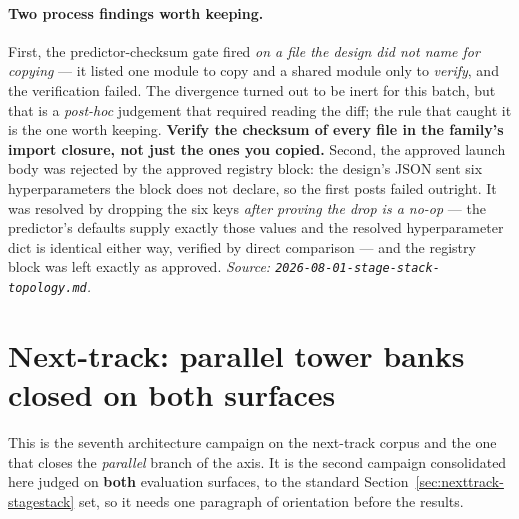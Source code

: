 \documentclass[11pt]{article}
\begin{document}
\paragraph{Two process findings worth keeping.} First, the predictor-checksum gate
fired \emph{on a file the design did not name for copying} --- it listed one module
to copy and a shared module only to \emph{verify}, and the verification failed. The
divergence turned out to be inert for this batch, but that is a \emph{post-hoc}
judgement that required reading the diff; the rule that caught it is the one worth
keeping. \textbf{Verify the checksum of every file in the family's import closure,
not just the ones you copied.} Second, the approved launch body was rejected by the
approved registry block: the design's JSON sent six hyperparameters the block does
not declare, so the first posts failed outright. It was resolved by dropping the
six keys \emph{after proving the drop is a no-op} --- the predictor's defaults supply
exactly those values and the resolved hyperparameter dict is identical either way,
verified by direct comparison --- and the registry block was left exactly as
approved.
\emph{Source: \texttt{2026-08-01-stage-stack-topology.md}.}

\section{Next-track: parallel tower banks closed on both surfaces}
\label{sec:nexttrack-towerbank}
This is the seventh architecture campaign on the next-track corpus and the one
that closes the \emph{parallel} branch of the axis. It is the second campaign
consolidated here judged on \textbf{both} evaluation surfaces, to the standard
Section~\ref{sec:nexttrack-stagestack} set, so it needs one paragraph of
orientation before the results.
\end{document}
